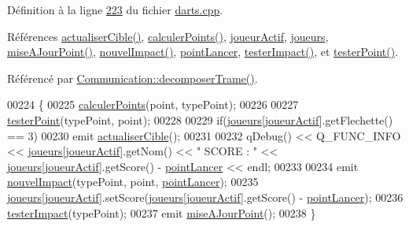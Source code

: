 Définition à la ligne \hyperlink{darts_8cpp_source_l00223}{223} du fichier \hyperlink{darts_8cpp_source}{darts.\+cpp}.



Références \hyperlink{class_darts_afcf6c21d8489e9cf1734458a23b518eb}{actualiser\+Cible()}, \hyperlink{darts_8cpp_source_l00478}{calculer\+Points()}, \hyperlink{darts_8h_source_l00076}{joueur\+Actif}, \hyperlink{darts_8h_source_l00073}{joueurs}, \hyperlink{class_darts_a455fa1efac223393aff2afbd33352569}{mise\+A\+Jour\+Point()}, \hyperlink{class_darts_aae5288e0c0f09a9837bcb7a517ede5af}{nouvel\+Impact()}, \hyperlink{darts_8h_source_l00078}{point\+Lancer}, \hyperlink{darts_8cpp_source_l00246}{tester\+Impact()}, et \hyperlink{darts_8cpp_source_l00204}{tester\+Point()}.



Référencé par \hyperlink{communication_8cpp_source_l00188}{Communication\+::decomposer\+Trame()}.


\begin{DoxyCode}
00224 \{
00225     \hyperlink{class_darts_a6a6c58dee559e851709d76fef9a8c6da}{calculerPoints}(point, typePoint);
00226 
00227     \hyperlink{class_darts_a7244911a7b1fe50023987a1c802a5103}{testerPoint}(typePoint, point);
00228 
00229     \textcolor{keywordflow}{if}(\hyperlink{class_darts_a81bc116f3ae70cea1f492f87f01901c7}{joueurs}[\hyperlink{class_darts_a68fb01b9aad6502e4429dfbf2a72d50b}{joueurActif}].getFlechette() == 3)
00230         emit \hyperlink{class_darts_afcf6c21d8489e9cf1734458a23b518eb}{actualiserCible}();
00231 
00232     qDebug() << Q\_FUNC\_INFO << \hyperlink{class_darts_a81bc116f3ae70cea1f492f87f01901c7}{joueurs}[\hyperlink{class_darts_a68fb01b9aad6502e4429dfbf2a72d50b}{joueurActif}].getNom() << \textcolor{stringliteral}{" SCORE : "} <<
      \hyperlink{class_darts_a81bc116f3ae70cea1f492f87f01901c7}{joueurs}[\hyperlink{class_darts_a68fb01b9aad6502e4429dfbf2a72d50b}{joueurActif}].getScore() - \hyperlink{class_darts_a7ed0e6c9c07930603f85c2bac5b9d78b}{pointLancer} << endl;
00233 
00234     emit \hyperlink{class_darts_aae5288e0c0f09a9837bcb7a517ede5af}{nouvelImpact}(typePoint, point, \hyperlink{class_darts_a7ed0e6c9c07930603f85c2bac5b9d78b}{pointLancer});
00235     \hyperlink{class_darts_a81bc116f3ae70cea1f492f87f01901c7}{joueurs}[\hyperlink{class_darts_a68fb01b9aad6502e4429dfbf2a72d50b}{joueurActif}].setScore(\hyperlink{class_darts_a81bc116f3ae70cea1f492f87f01901c7}{joueurs}[\hyperlink{class_darts_a68fb01b9aad6502e4429dfbf2a72d50b}{joueurActif}].getScore() - 
      \hyperlink{class_darts_a7ed0e6c9c07930603f85c2bac5b9d78b}{pointLancer});
00236     \hyperlink{class_darts_af34338eccf367fb9ed939ff95768a221}{testerImpact}(typePoint);
00237     emit \hyperlink{class_darts_a455fa1efac223393aff2afbd33352569}{miseAJourPoint}();
00238 \}
\end{DoxyCode}
\mbox{\label{class_darts_a70c68ed8bd56b63df203c25e6ed14f3b}} 
